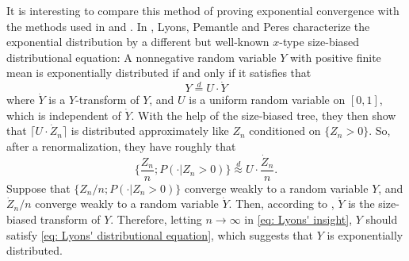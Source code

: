 \documentclass[ECP]{ejpecp} %
\begin{document}
It is interesting to compare this method of proving exponential convergence with the methods
used in \cite{geiger2000new} and \cite{lyons1995conceptual}.
In \cite{lyons1995conceptual}, Lyons, Pemantle and Peres characterize the exponential distribution by a different
but well-known $x$-type size-biased distributional equation:
A nonnegative random variable $Y$ with positive finite mean is exponentially distributed if and only if it satisfies that
\begin{equation}
\label{eq: Lyons' distributional equation}
Y 		\overset{d}= U \cdot \dot Y
\end{equation}
	where $\dot Y$ is a $Y$-transform of $Y$,  and $U$ is a uniform random variable on $[0,1]$, which is independent of $\dot Y$.
	With the help of the size-biased tree, 
	they then show that $\lceil U \cdot \dot Z_n \rceil$ is distributed approximately like $Z_n$ conditioned on $\{Z_n > 0\}$.
	So, after a renormalization, they have roughly that
\begin{equation}
\label{eq: Lyons' insight}
\Big\{\frac{Z_n}{n} ; P(  \cdot| Z_n > 0) \Big\}
\overset{d}{\approx} U \cdot \frac{ \dot Z_n}{n}.
\end{equation}
Suppose that $\{Z_n/n; P(\cdot | Z_n > 0)\}$ converge weakly to a random variable $Y$, and $\dot Z_n /n$ converge weakly to a random variable $\dot Y$.
Then, according to \cite[Lemma 4.3]{lyons1995conceptual}, $\dot Y$ is the size-biased transform of $Y$.
Therefore, letting $n\to \infty$ in \eqref{eq: Lyons' insight},
$Y$ should satisfy \eqref{eq: Lyons' distributional equation}, which suggests that $Y$ is exponentially distributed.
\end{document}
